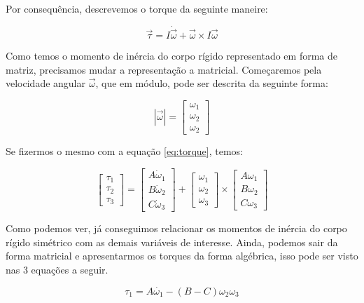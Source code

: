 Por consequência, descrevemos o torque da seguinte maneire:

\begin{equation}\label{eq:torque}
\vec{\tau}=I\dot{\vec{\omega}}+\vec{\omega}\times I \vec{\omega}
\end{equation}

Como temos o momento de inércia do corpo rígido representado em forma de matriz, precisamos mudar a representação a matricial. Começaremos pela velocidade angular $\vec{\omega}$, que em módulo, pode ser descrita da seguinte forma:

\begin{equation}
\left|\vec{\omega}\right|=\begin{bmatrix}\omega_1\\\omega_2\\\omega_2\end{bmatrix}
\end{equation}

Se fizermos o mesmo com a equação \ref{eq:torque}, temos:

\begin{equation}
\begin{bmatrix}\tau_{1}\\\tau_{2}\\\tau_{3}\end{bmatrix}=\begin{bmatrix}A\dot{\omega}_{1}\\B\dot{\omega}_{2}\\C\dot{\omega}_{3}\end{bmatrix}+\begin{bmatrix}\omega_{1}\\\omega_{2}\\\omega_{3}\end{bmatrix}\times\begin{bmatrix}A\omega_{1}\\B\omega_{2}\\C\omega_{3}\end{bmatrix}
\end{equation}

Como podemos ver, já conseguimos relacionar os momentos de inércia do corpo rígido simétrico com as demais variáveis de interesse. Ainda, podemos sair da forma matricial e apresentarmos os torques da forma algébrica, isso pode ser visto nas 3 equações a seguir.

\begin{equation}
  \tau_1=A\dot{\omega_1}-(B-C)\omega_2\omega_3 
\end{equation}

